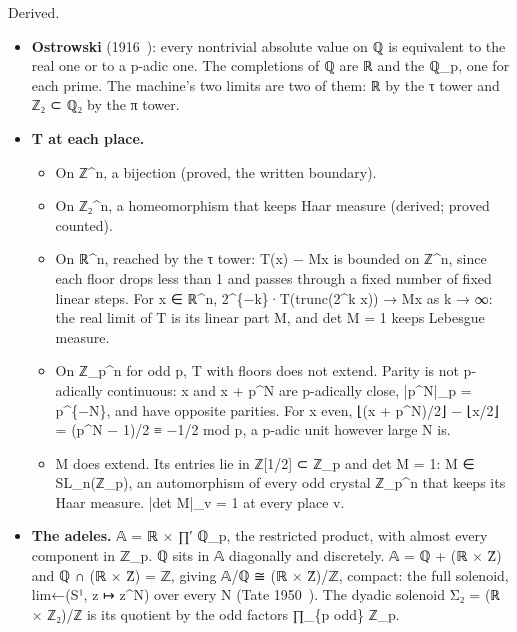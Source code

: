 Derived.

\begin{itemize}
\item \textbf{Ostrowski} (1916~\cite{src:Ostrowski-1916}): every nontrivial absolute value on ℚ is equivalent to the real one or to a p-adic one. The completions of ℚ are ℝ and the ℚ\_\allowbreak{}p, one for each prime. The machine's two limits are two of them: ℝ by the τ tower and ℤ₂ ⊂ ℚ₂ by the π tower.
\item \textbf{T at each place.}

\begin{itemize}
\item On ℤ\textasciicircum{}n, a bijection (proved, the written boundary).
\item On ℤ₂\textasciicircum{}n, a homeomorphism that keeps Haar measure (derived; proved counted).
\item On ℝ\textasciicircum{}n, reached by the τ tower: T(x) − Mx is bounded on ℤ\textasciicircum{}n, since each floor drops less than 1 and passes through a fixed number of fixed linear steps. For x ∈ ℝ\textasciicircum{}n, 2\textasciicircum{}\{−k\}·T(trunc(2\textasciicircum{}k x)) → Mx as k → ∞: the real limit of T is its linear part M, and det M = 1 keeps Lebesgue measure.
\item On ℤ\_\allowbreak{}p\textasciicircum{}n for odd p, T with floors does not extend. Parity is not p-adically continuous: x and x + p\textasciicircum{}N are p-adically close, |p\textasciicircum{}N|\_\allowbreak{}p = p\textasciicircum{}\{−N\}, and have opposite parities. For x even, ⌊(x + p\textasciicircum{}N)/2⌋ − ⌊x/2⌋ = (p\textasciicircum{}N − 1)/2 ≡ −1/2 mod p, a p-adic unit however large N is.
\item M does extend. Its entries lie in ℤ[1/2] ⊂ ℤ\_\allowbreak{}p and det M = 1: M ∈ SL\_\allowbreak{}n(ℤ\_\allowbreak{}p), an automorphism of every odd crystal ℤ\_\allowbreak{}p\textasciicircum{}n that keeps its Haar measure. |det M|\_\allowbreak{}v = 1 at every place v.
\end{itemize}
\item \textbf{The adeles.} 𝔸 = ℝ × ∏′ ℚ\_\allowbreak{}p, the restricted product, with almost every component in ℤ\_\allowbreak{}p. ℚ sits in 𝔸 diagonally and discretely. 𝔸 = ℚ + (ℝ × Ẑ) and ℚ ∩ (ℝ × Ẑ) = ℤ, giving 𝔸/ℚ ≅ (ℝ × Ẑ)/ℤ, compact: the full solenoid, lim←(S¹, z ↦ z\textasciicircum{}N) over every N (Tate 1950~\cite{src:Tate-1950}). The dyadic solenoid Σ₂ = (ℝ × ℤ₂)/ℤ is its quotient by the odd factors ∏\_\allowbreak{}\{p odd\} ℤ\_\allowbreak{}p.

\end{itemize}
